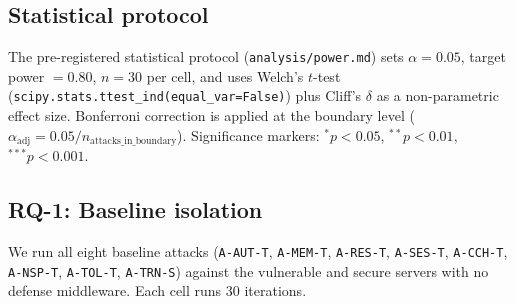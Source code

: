 \subsection{Statistical protocol}

The pre-registered statistical protocol
(\texttt{analysis/power.md}) sets $\alpha = 0.05$, target
power $= 0.80$, $n = 30$ per cell, and uses Welch's $t$-test
(\texttt{scipy.stats.ttest\_ind(equal\_var=False)}) plus
Cliff's $\delta$ as a non-parametric effect size. Bonferroni
correction is applied at the boundary level
($\alpha_{\mathrm{adj}} = 0.05 / n_{\mathrm{attacks\_in\_boundary}}$).
Significance markers: $^{*} p < 0.05$, $^{**} p < 0.01$,
$^{***} p < 0.001$.

\subsection{RQ-1: Baseline isolation}\label{sec:rq1}

We run all eight baseline attacks (\texttt{A-AUT-T},
\texttt{A-MEM-T}, \texttt{A-RES-T}, \texttt{A-SES-T},
\texttt{A-CCH-T}, \texttt{A-NSP-T}, \texttt{A-TOL-T},
\texttt{A-TRN-S}) against the vulnerable and secure servers
with no defense middleware. Each cell runs 30 iterations.

